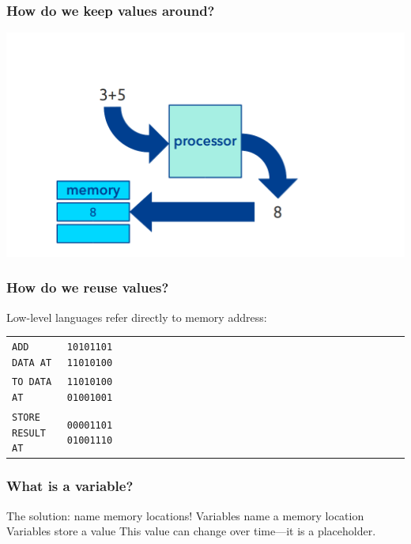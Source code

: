 \documentclass[11pt]{beamer}
\begin{document}
\begin{frame}
  \frametitle{How do we keep values around?}
  \includegraphics[width=\textwidth]{./img/computer-memory-0.png}
\end{frame}

\begin{frame}
  \frametitle{How do we reuse values?}
  \Enlarge

  \begin{itemize}
  \myitem  Low-level languages refer directly to memory address:
  \begin{tabular}{*{27}{l}}
    \texttt{ADD DATA AT}     & \texttt{10101101 11010100} \\
    \texttt{TO DATA AT}      & \texttt{11010100 01001001} \\
    \texttt{STORE RESULT AT} & \texttt{00001101 01001110} \\
  \end{tabular}
  \end{itemize}
\end{frame}

\begin{frame}
  \frametitle{What is a \textbf{variable}?}
  \Enlarge

  \begin{itemize}
  \myitem  The solution:  \textcolor{CS101GradBot}{name memory locations!} \pause
  \myitem  Variables name a memory location \pause
  \myitem  Variables store a value \pause
  \myitem  This value can change over time---it is a placeholder.
  \end{itemize}
\end{frame}
\end{document}
